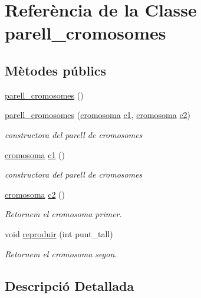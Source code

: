 \hypertarget{classparell__cromosomes}{}\section{Referència de la Classe parell\+\_\+cromosomes}
\label{classparell__cromosomes}
\subsection*{Mètodes públics}
\begin{DoxyCompactItemize}
\item 
\hyperlink{classparell__cromosomes_a9d86452d029f65ccf80c8861c4914698}{parell\+\_\+cromosomes} ()
\item 
\hyperlink{classparell__cromosomes_a570c84372e02ac0792b7d53eff2f73bb}{parell\+\_\+cromosomes} (\hyperlink{classcromosoma}{cromosoma} \hyperlink{classparell__cromosomes_af9f8dd9154e1c23176a9b4fc99876d2c}{c1}, \hyperlink{classcromosoma}{cromosoma} \hyperlink{classparell__cromosomes_aeef1645e5ce4276c9b33efefb0fde5fa}{c2})
\begin{DoxyCompactList}\small\item\em constructora del parell de cromosomes \end{DoxyCompactList}\item 
\hyperlink{classcromosoma}{cromosoma} \hyperlink{classparell__cromosomes_af9f8dd9154e1c23176a9b4fc99876d2c}{c1} ()
\begin{DoxyCompactList}\small\item\em constructora del parell de cromosomes \end{DoxyCompactList}\item 
\hyperlink{classcromosoma}{cromosoma} \hyperlink{classparell__cromosomes_aeef1645e5ce4276c9b33efefb0fde5fa}{c2} ()
\begin{DoxyCompactList}\small\item\em Retornem el cromosoma primer. \end{DoxyCompactList}\item 
void \hyperlink{classparell__cromosomes_a70760dca0beb7da1d59f70d8cfca83a5}{reproduir} (int punt\+\_\+tall)
\begin{DoxyCompactList}\small\item\em Retornem el cromosoma segon. \end{DoxyCompactList}\end{DoxyCompactItemize}


\subsection{Descripció Detallada}


